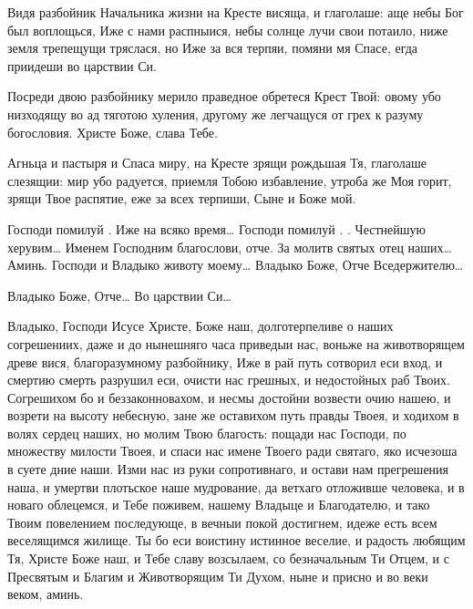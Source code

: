 \begin{mymulticols}
 Видя разбойник Начальника жизни на Кресте висяща, и глаголаше: аще небы Бог был воплощься, Иже с нами распныися, небы солнце лучи свои потаило, ниже земля трепещущи тряслася, но Иже за вся терпяи, помяни мя Спасе, егда приидеши во царствии Си. 

 Посреди двою разбойнику мерило праведное обретеся Крест Твой: овому убо низходящу во ад тяготою хуления, другому же легчащуся от грех к разуму богословия. Христе Боже, слава Тебе. 

 Агньца и пастыря и Спаса миру, на Кресте зрящи рождьшая Тя, глаголаше слезящии: мир убо радуется, приемля Тобою избавление, утроба же Моя горит, зрящи Твое распятие, еже за всех терпиши, Сыне и Боже мой. 


 Господи помилуй . Иже на всяко время… Господи помилуй . . Честнейшую херувим… Именем Господним благослови, отче. За молитв святых отец наших… Аминь.  Господи и Владыко животу моему…  Владыко Боже, Отче Вседержителю…


 Владыко Боже, Отче…  Во царствии Си…


 Владыко, Господи Исусе Христе, Боже наш, долготерпеливе о наших согрешениих, даже и до нынешняго часа приведыи нас, воньже на животворящем древе вися, благоразумному разбойнику, Иже в рай путь сотворил еси вход, и смертию смерть разрушил еси, очисти нас грешных, и недостойных раб Твоих. Согрешихом бо и беззаконновахом, и несмы достойни возвести очию нашею, и возрети на высоту небесную, зане же оставихом путь правды Твоея, и ходихом в волях сердец наших, но молим Твою благость: пощади нас Господи, по множеству милости Твоея, и спаси нас имене Твоего ради святаго, яко исчезоша в суете дние наши. Изми нас из руки сопротивнаго, и остави нам прегрешения наша, и умертви плотьское наше мудрование, да ветхаго отложивше человека, и в новаго облецемся, и Тебе поживем, нашему Владыце и Благодателю, и тако Твоим повелением последующе, в вечныи покой достигнем, идеже есть всем веселящимся жилище. Ты бо еси воистину истинное веселие, и радость любящим Тя, Христе Боже наш, и Тебе славу возсылаем, со безначальным Ти Отцем, и с Пресвятым и Благим и Животворящим Ти Духом, ныне и присно и во веки веком, аминь.


\end{mymulticols}

